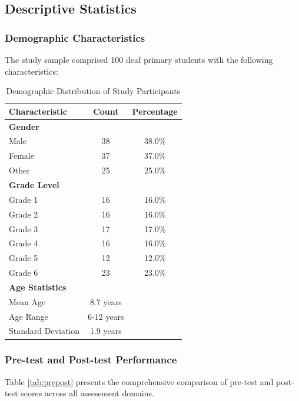 \documentclass[12pt,a4paper]{article}
\begin{document}
\subsection{Descriptive Statistics}

\subsubsection{Demographic Characteristics}

The study sample comprised 100 deaf primary students with the following characteristics:

\begin{table}[H]
\centering
\caption{Demographic Distribution of Study Participants}
\begin{tabular}{lcc}
\toprule
\textbf{Characteristic} & \textbf{Count} & \textbf{Percentage} \\
\midrule
\textbf{Gender} & & \\
Male & 38 & 38.0\% \\
Female & 37 & 37.0\% \\
Other & 25 & 25.0\% \\
\midrule
\textbf{Grade Level} & & \\
Grade 1 & 16 & 16.0\% \\
Grade 2 & 16 & 16.0\% \\
Grade 3 & 17 & 17.0\% \\
Grade 4 & 16 & 16.0\% \\
Grade 5 & 12 & 12.0\% \\
Grade 6 & 23 & 23.0\% \\
\midrule
\textbf{Age Statistics} & & \\
Mean Age & 8.7 years & \\
Age Range & 6-12 years & \\
Standard Deviation & 1.9 years & \\
\bottomrule
\end{tabular}
\end{table}

\subsubsection{Pre-test and Post-test Performance}

Table \ref{tab:prepost} presents the comprehensive comparison of pre-test and post-test scores across all assessment domains.
\end{document}
